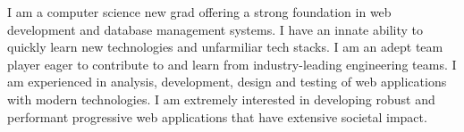 
\begin{cvparagraph}
I am a computer science new grad offering a strong foundation in web development and database management systems. I have an innate ability to quickly learn new technologies
and unfarmiliar tech stacks. I am an adept team player eager to contribute to and learn from industry-leading engineering teams. I am experienced in analysis, development, design and testing
of web applications with modern technologies. I am extremely interested in developing robust and performant progressive web applications that have extensive societal impact.
\end{cvparagraph}
